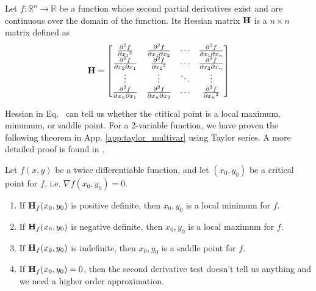 \documentclass[a4paper]{article}
\numberwithin{equation}{section} %
\newcommand{\setR}{\mathbb{R}} %
\newcommand{\setRn}{\mathbb{R}^n} %
\newcommand{\B}[1]{\textbf{\textup{#1}}} %
\renewcommand{\eqref}{Eq.~\originaleqref}
\renewcommand*{\eqref}[1]{Eq.~\originaleqref{#1}}
\begin{document}
\begin{shaded*}
\begin{definition}
Let $f:\setRn \rightarrow \setR$ be a function whose second partial derivatives exist  and are continuous over the domain of the function. Its Hessian matrix $\B{H}$ is a $n \times n$ matrix defined as
\\ \quad %
\begin{equation}
\B{H}=
\begin{bmatrix}
   \frac{{{\partial }^{2}}f}{\partial {{x}_{1}}^{2}} & \frac{{{\partial }^{2}}f}{\partial {{x}_{1}}\partial {{x}_{2}}} & \cdots  & \frac{{{\partial }^{2}}f}{\partial {{x}_{1}}\partial {{x}_{n}}}  \\
   \frac{{{\partial }^{2}}f}{\partial {{x}_{2}}\partial {{x}_{1}}} & \frac{{{\partial }^{2}}f}{\partial {{x}_{2}}^{2}} & \cdots  & \frac{{{\partial }^{2}}f}{\partial {{x}_{2}}\partial {{x}_{n}}}  \\
   \vdots  & \vdots  & \ddots  & \vdots   \\
   \frac{{{\partial }^{2}}f}{\partial {{x}_{n}}\partial {{x}_{1}}} & \frac{{{\partial }^{2}}f}{\partial {{x}_{n}}\partial {{x}_{2}}} & \cdots  & \frac{{{\partial }^{2}}f}{\partial {{x}_{n}}^{2}}  \\
\end{bmatrix} 
\label{eq:hessian_def}
\end{equation}
\end{definition}
\end{shaded*}
Hessian in \eqref{eq:hessian_def} can tell us whether the ctitical point is a local maximum, minumum, or saddle point. For a 2-variable function, we have proven the following theorem in App. \ref{app:taylor_multivar} using Taylor series. A more detailed proof is found in \cite{book_beck}.
\begin{shaded*}
\begin{theorem}
Let $f(x,y)$ be a twice differentiable function, and let $(x_0,y_0)$ be a critical point for $f$, i.e. $\nabla f(x_0,y_0)=0$.
\begin{enumerate}
\item If $\B{H}_f(x_0,y_0)$ is positive definite, then $x_0,y_0$ is a local minimum for $f$.
\item If $\B{H}_f(x_0,y_0)$ is negative definite, then $x_0,y_0$ is a local maximum for $f$.
\item If $\B{H}_f(x_0,y_0)$ is indefinite, then $x_0,y_0$ is a saddle point for $f$.
\item If $\B{H}_f(x_0,y_0)=0$, then the second derivative test doesn't tell us anything and we need a higher order approximation.
\end{enumerate}
\label{theorem:crit_point_hessian}
\end{theorem}
\end{shaded*}
\end{document}
